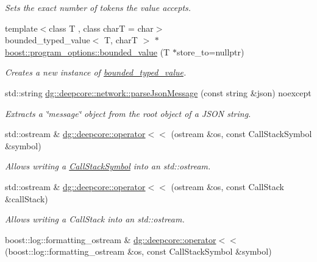 \begin{DoxyCompactItemize}
\begin{DoxyCompactList}\small\item\em Sets the exact number of tokens the value accepts. \end{DoxyCompactList}\item 
{\footnotesize template$<$class T , class charT  = char$>$ }\\bounded\+\_\+typed\+\_\+value$<$ T, charT $>$ $\ast$ \hyperlink{group___utility_module_ga29195cfb403d70365c30a76867c787b5}{boost\+::program\+\_\+options\+::bounded\+\_\+value} (T $\ast$store\+\_\+to=nullptr)
\begin{DoxyCompactList}\small\item\em Creates a new instance of \hyperlink{classboost_1_1program__options_1_1bounded__typed__value}{bounded\+\_\+typed\+\_\+value}. \end{DoxyCompactList}\item 
std\+::string \hyperlink{group___utility_module_gab8f3ab23c87fe876bb3e9b76fc46fff9}{dg\+::deepcore\+::network\+::parse\+Json\+Message} (const string \&json) noexcept
\begin{DoxyCompactList}\small\item\em Extracts a \char`\"{}message\char`\"{} object from the root object of a J\+S\+ON string. \end{DoxyCompactList}\item 
std\+::ostream \& \hyperlink{group___utility_module_gafa131d4872913d78dd09474524e54de3}{dg\+::deepcore\+::operator$<$$<$} (ostream \&os, const Call\+Stack\+Symbol \&symbol)
\begin{DoxyCompactList}\small\item\em Allows writing a \hyperlink{structdg_1_1deepcore_1_1_call_stack_symbol}{Call\+Stack\+Symbol} into an std\+::ostream. \end{DoxyCompactList}\item 
std\+::ostream \& \hyperlink{group___utility_module_ga0e3995beecca99ed6a56bbd006d778cf}{dg\+::deepcore\+::operator$<$$<$} (ostream \&os, const Call\+Stack \&call\+Stack)
\begin{DoxyCompactList}\small\item\em Allows writing a Call\+Stack into an std\+::ostream. \end{DoxyCompactList}\item 
boost\+::log\+::formatting\+\_\+ostream \& \hyperlink{group___utility_module_ga97adfcc9f917f8bd42421eaa2d618ef6}{dg\+::deepcore\+::operator$<$$<$} (boost\+::log\+::formatting\+\_\+ostream \&os, const Call\+Stack\+Symbol \&symbol)

\end{DoxyCompactItemize}
